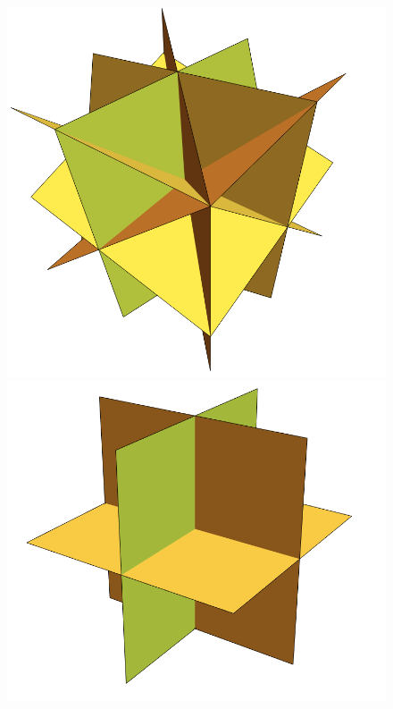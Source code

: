 \documentclass{amsart}
\theoremstyle{definition}
\begin{document}
\begin{figure}[p]
	\centerline{
		\includegraphics[scale=.3]{HypSimplex.png}
		\includegraphics[scale=.35]{HypCube.png} \ \
}
\end{figure}
\end{document}
